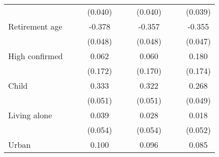 {\begin{tabular}{l*{9}{c}}
                    &                     &                     &     (0.040)         &                     &                     &     (0.040)         &                     &                     &     (0.039)         \\
\addlinespace
Retirement age      &                     &                     &      -0.378\sym{***}&                     &                     &      -0.357\sym{***}&                     &                     &      -0.355\sym{***}\\
                    &                     &                     &     (0.048)         &                     &                     &     (0.048)         &                     &                     &     (0.047)         \\
\addlinespace
High confirmed      &                     &                     &       0.062         &                     &                     &       0.060         &                     &                     &       0.180         \\
                    &                     &                     &     (0.172)         &                     &                     &     (0.170)         &                     &                     &     (0.174)         \\
\addlinespace
Child               &                     &                     &       0.333\sym{***}&                     &                     &       0.322\sym{***}&                     &                     &       0.268\sym{***}\\
                    &                     &                     &     (0.051)         &                     &                     &     (0.051)         &                     &                     &     (0.049)         \\
\addlinespace
Living alone        &                     &                     &       0.039         &                     &                     &       0.028         &                     &                     &       0.018         \\
                    &                     &                     &     (0.054)         &                     &                     &     (0.054)         &                     &                     &     (0.052)         \\
\addlinespace
Urban               &                     &                     &       0.100\sym{**} &                     &                     &       0.096\sym{**} &                     &                     &       0.085\sym{*}  \\

\end{tabular}}
